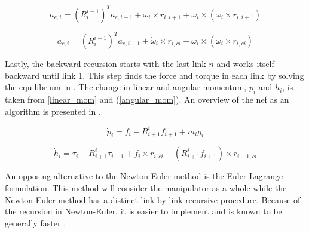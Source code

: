 \begin{equation}\label{a_end}
a_{e,i} = \left ( R^{i-1}_i \right )^T a_{e,i-1} + \dot{\omega}_i \times r_{i,i+1}+\omega_i \times \left ( \omega_i \times r_{i,i+1} \right )
\end{equation}

\begin{equation}\label{a_center}
a_{c,i} = \left ( R^{i-1}_i \right )^T a_{e,i-1} + \dot{\omega}_i \times r_{i,ci}+\omega_i \times \left ( \omega_i \times r_{i,ci} \right )
\end{equation}

Lastly, the backward recursion starts with the last link $n$ and works itself backward until link 1. This step finds the force and torque in each link by solving the equilibrium in . The change in linear and angular momentum, $\dot{p}_i$ and $\dot{h}_i$, is taken from \eqref{linear_mom} and (\ref{angular_mom}). An overview of the \gls{nef} as an algorithm is presented in .

\begin{equation}\label{linear_equi}
\dot{p}_i = f_i - R^i_{i+1} f_{i+1} + m_i g_i
\end{equation}

\begin{equation}\label{angular_equi}
\dot{h}_i = \tau_i - R^i_{i+1}\tau_{i+1} + f_i \times r_{i,ci}-\left ( R^i_{i+1}f_{i+1} \right ) \times r_{i+1,ci}
\end{equation}

An opposing alternative to the Newton-Euler method is the Euler-Lagrange formulation. This method will consider the manipulator as a whole while the Newton-Euler method has a distinct link by link recursive procedure. Because of the recursion in Newton-Euler, it is easier to implement and is known to be generally faster \cite{Hollerbach1980}.

\clearpage







